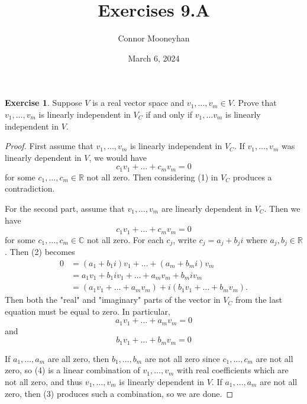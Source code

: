\documentclass{article}
\title{Exercises 9.A}
\author{Connor Mooneyhan}
\date{March 6, 2024}
\theoremstyle{definition}
\newtheorem{ex}{Exercise}
\begin{document}
\maketitle

\setcounter{ex}{2}

\begin{ex}
	Suppose $V$ is a real vector space and $v_1, \dots, v_m \in V$.
	Prove that $v_1, \dots , v_m$ is linearly independent in $V_C$ if and only if $v_1, \dots v_m$ is linearly independent in $V$.
\end{ex}
\begin{proof}
	First assume that $v_1, \dots ,v_m$ is linearly independent in $V_C$.
	If $v_1, \dots, v_m$ was linearly dependent in $V$, we would have \begin{equation}
		c_1v_1 + \dots + c_mv_m = 0
	\end{equation} for some $c_1, \dots, c_m \in \mathbb{R}$ not all zero.
	Then considering (1) in $V_C$ produces a contradiction.

	For the second part, assume that $v_1, \dots, v_m$ are linearly dependent in $V_C$.
	Then we have \begin{equation}
		c_1v_1 + \dots + c_mv_m = 0
	\end{equation} for some $c_1, \dots, c_m \in \mathbb{C}$ not all zero.
	For each $c_j$, write $c_j = a_j + b_ji$ where $a_j, b_j \in \mathbb{R}$.
	Then (2) becomes \begin{align*}
		0 & = (a_1 + b_1i)v_1 + \dots + (a_m + b_mi)v_m               \\
		  & = a_1v_1 + b_1iv_1 + \dots + a_mv_m + b_miv_m             \\
		  & = (a_1v_1 + \dots + a_mv_m) + i(b_1v_1 + \dots + b_mv_m).
	\end{align*}
	Then both the "real" and "imaginary" parts of the vector in $V_C$ from the last equation must be equal to zero.
	In particular, \begin{equation}
		a_1v_1 + \dots + a_mv_m = 0
	\end{equation} and \begin{equation}
		b_1v_1 + \dots + b_mv_m = 0
	\end{equation}

	If $a_1, \dots, a_m$ are all zero, then $b_1, \dots, b_m$ are not all zero since $c_1, \dots, c_m$ are not all zero, so (4) is a linear combination of $v_1, \dots, v_m$ with real coefficients which are not all zero, and thus $v_1, \dots, v_m$ is linearly dependent in $V$.
	If $a_1, \dots, a_m$ are not all zero, then (3) produces such a combination, so we are done.
\end{proof}
\end{document}
